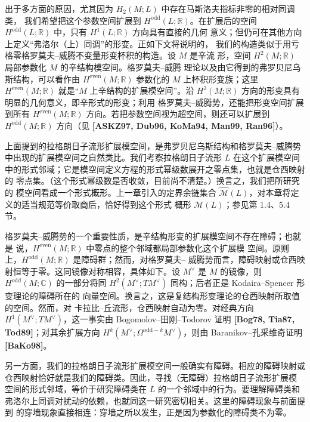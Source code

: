 出于多方面的原因，尤其因为 $H_2(M;L)$ 中存在马斯洛夫指标非零的相对同调类，
我们希望把这个参数空间扩展到 $H^{\mathrm{odd}}(L;\mathbb R)$。在扩展后的空间
$H^{\mathrm{odd}}(L;\mathbb R)$ 中，只有 $H^1(L;\mathbb R)$ 方向具有直接的几何
意义；但仍可在其他方向上定义“弗洛尔（上）同调”的形变。正如下文将说明的，
我们的构造类似于用亏格零格罗莫夫--威腾不变量形变杯积的构造。设 $M$ 是辛流
形，空间 $H^2(M;\mathbb R)$ 局部参数化 $M$ 的辛结构模空间。格罗莫夫--威腾
理论以及由它得到的弗罗贝尼乌斯结构，可以看作由
$H^{\mathrm{even}}(M;\mathbb R)$ 参数化的 $M$ 上杯积形变族；这里
$H^{\mathrm{even}}(M;\mathbb R)$ 就是“$M$ 上辛结构的扩展模空间”。沿
$H^2(M;\mathbb R)$ 方向的形变具有明显的几何意义，即辛形式的形变；利用
格罗莫夫--威腾势，还能把形变空间扩展到所有 $H^{\mathrm{even}}(M;\mathbb R)$
方向。若把参数空间视为超空间，则还可以扩展到
$H^{\mathrm{odd}}(M;\mathbb R)$ 方向（见
\textbf{[ASKZ97, Dub96, KoMa94, Man99, Ran96]}）。

上面提到的拉格朗日子流形扩展模空间，是弗罗贝尼乌斯结构和格罗莫夫--威腾势
中出现的扩展模空间之自然类比。我们考察拉格朗日子流形 $L$ 在这个扩展模空间
中的形式邻域；它是模空间定义方程的形式幂级数展开之零点集，也就是仓西映射的
零点集。（这个形式幂级数是否收敛，目前尚不清楚。）换言之，我们把所研究的
模空间看成一个形式概形。上一章引入的定界余链集合
$\widehat{\mathcal M}(L)$，对本章将定义的适当规范等价取商后，恰好得到这个形式
概形 $\mathcal M(L)$；参见第 1.4、5.4 节。

格罗莫夫--威腾势的一个重要性质，是辛结构形变的扩展模空间不存在障碍；也就是
说，$H^{\mathrm{even}}(M;\mathbb R)$ 中零点的整个邻域都局部参数化这个扩展模
空间。原则上，$H^{\mathrm{odd}}(M;\mathbb R)$ 是障碍群；然而，对格罗莫夫--
威腾势而言，障碍映射或仓西映射恒等于零。这同镜像对称相容，具体如下。设
$M^\vee$ 是 $M$ 的镜像，则 $H^{\mathrm{odd}}(M;\mathbb C)$ 的一部分将同
$H^2(M^\vee;TM^\vee)$ 同构；后者正是 Kodaira--Spencer 形变理论的障碍所在的
向量空间。换言之，这是复结构形变理论的仓西映射所取值的空间。然而，对
卡拉比--丘流形，仓西映射自动为零。对经典方向
$H^1(M^\vee;TM^\vee)$，这一事实由 Bogomolov--田刚--Todorov 证明
\textbf{[Bog78, Tia87, Tod89]}；对其余扩展方向
$H^k(M^\vee;\Omega^{\mathrm{odd}-k}M^\vee)$，则由
Baranikov--孔采维奇证明 \textbf{[BaKo98]}。

另一方面，我们的拉格朗日子流形扩展模空间一般确实有障碍。相应的障碍映射或
仓西映射恰好就是我们的障碍类。因此，寻找（无障碍）拉格朗日子流形扩展模
空间的形式邻域，等价于研究障碍类在 $L$ 的一个邻域中的行为。要理解障碍类和
弗洛尔上同调对扰动的依赖，也就同这一研究密切相关。这里的障碍现象与前面提到
的穿墙现象直接相连：穿墙之所以发生，正是因为参数化的障碍类不为零。

